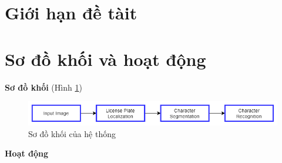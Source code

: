     \section{Giới hạn đề tàit}
    
    
    \section{Sơ đồ khối và hoạt động}
    \textbf{Sơ đồ khối} (Hình \ref{fig:sysblockdiagram})
    \begin{figure}[htp]
    		\centering
     		\includegraphics[scale=.55]{images/sys_block_diagram.png}
    		\caption{Sơ đồ khối của hệ thống}
    		\label{fig:sysblockdiagram}
    	\end{figure}
    \textbf{Hoạt động}